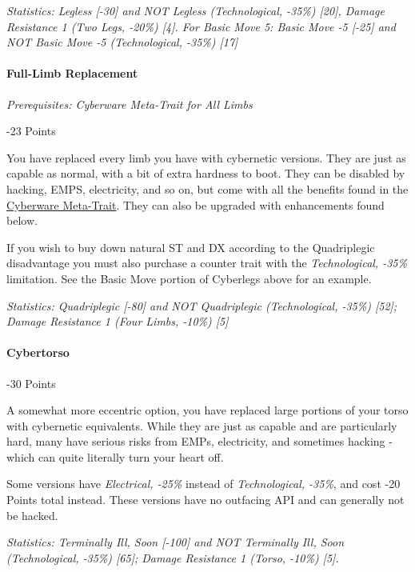 \begin{multicols*}{3}
	\textit{\textcolor{OliveGreen}{Statistics:  Legless [-30] and NOT Legless (Technological, -35\%) [20], Damage Resistance 1 (Two Legs, -20\%) [4]. For Basic Move 5: Basic Move -5 [-25] and NOT Basic Move -5 (Technological, -35\%) [17]}}
	
	\paragraph{Full-Limb Replacement}
	\textit{Prerequisites:  Cyberware Meta-Trait for All Limbs}
	\begin{flushright}
		-23 Points
	\end{flushright}
	
	You have replaced every limb you have with cybernetic versions. They are just as capable as normal, with a bit of extra hardness to boot. They can be disabled by hacking, EMPS, electricity, and so on, but come with all the benefits found in the \hyperref[cyberware-meta-trait]{Cyberware Meta-Trait}. They can also be upgraded with enhancements found below.
	
	If you wish to buy down natural ST and DX according to the Quadriplegic disadvantage you must also purchase a counter trait with the \textit{Technological, -35\%} limitation. See the Basic Move portion of Cyberlegs above for an example.
	
	\textit{\textcolor{OliveGreen}{Statistics: Quadriplegic [-80] and NOT Quadriplegic (Technological, -35\%) [52]; Damage Resistance 1 (Four Limbs, -10\%) [5]}}
	
	\paragraph{Cybertorso}
	\begin{flushright}
		-30 Points
	\end{flushright}

	A somewhat more eccentric option, you have replaced large portions of your torso with cybernetic equivalents. While they are just as capable and are particularly hard, many have serious risks from EMPs, electricity, and sometimes hacking - which can quite literally turn your heart off.
	
	Some versions have \textit{Electrical, -25\%} instead of \textit{Technological, -35\%}, and cost -20 Points total instead. These versions have no outfacing API and can generally not be hacked.
	
	\textit{\textcolor{OliveGreen}{Statistics: Terminally Ill, Soon [-100] and NOT Terminally Ill, Soon (Technological, -35\%) [65]; Damage Resistance 1 (Torso, -10\%) [5].}}
	

\end{multicols*}
